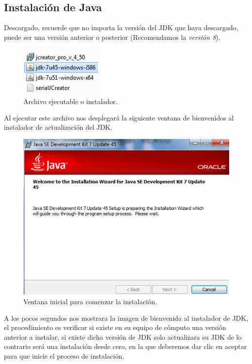 \subsection{Instalación de Java}   
Descargado, recuerde que no importa la versión del JDK que haya descargado,
puede ser una versión anterior o posterior (Recomendamos la \textit{versión 8}).

\begin{figure}[H]
	\begin{center}
		\includegraphics[scale=.4]{images/instalaciones/java/img_java_1}
		\caption{Archivo ejecutable o instalador.}
	\end{center}
\end{figure} 

 Al ejecutar este archivo nos desplegará la siguiente ventana de
bienvenidos al instalador de actualización del JDK.    

\begin{figure}[H]
	\begin{center}
		\includegraphics[scale=.4]{images/instalaciones/java/img_java_2}
		\caption{Ventana inicial para comenzar la instalación.}
	\end{center}
\end{figure} 

 A los pocos
segundos nos mostrara la imagen de bienvenida al instalador de JDK, el
procedimiento es verificar si existe en su equipo de cómputo una versión
anterior a instalar, si existe dicha versión de JDK solo actualizara su JDK de
lo contrario será una instalación desde cero, en la que deberemos dar clic en
aceptar para que inicie el proceso de instalación.

